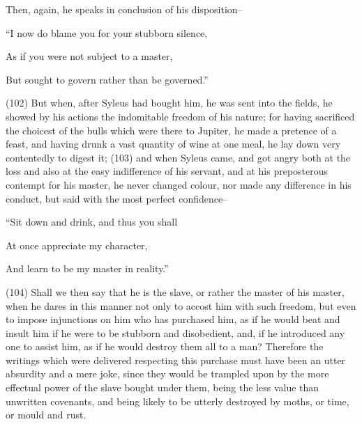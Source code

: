 Then, again, he speaks in conclusion of his disposition--

``I now do blame you for your stubborn silence,

As if you were not subject to a master,

But sought to govern rather than be governed.''

(102) But when, after Syleus had bought him, he was sent into the fields, he showed by his actions
the indomitable freedom of his nature; for having sacrificed the choicest of the bulls which were
there to Jupiter, he made a pretence of a feast, and having drunk a vast quantity of wine at one
meal, he lay down very contentedly to digest it; (103) and when Syleus came, and got angry both at
the loss and also at the easy indifference of his servant, and at his preposterous contempt for his
master, he never changed colour, nor made any difference in his conduct, but said with the most
perfect confidence--

``Sit down and drink, and thus you shall

At once appreciate my character,

And learn to be my master in reality.''

(104) Shall we then say that he is the slave, or rather the master of his master, when he dares in
this manner not only to accost him with such freedom, but even to impose injunctions on him who
has purchased him, as if he would beat and insult him if he were to be stubborn and disobedient,
and, if he introduced any one to assist him, as if he would destroy them all to a man? Therefore the
writings which were delivered respecting this purchase must have been an utter absurdity and a
mere joke, since they would be trampled upon by the more effectual power of the slave bought
under them, being the less value than unwritten covenants, and being likely to be utterly destroyed
by moths, or time, or mould and rust.

